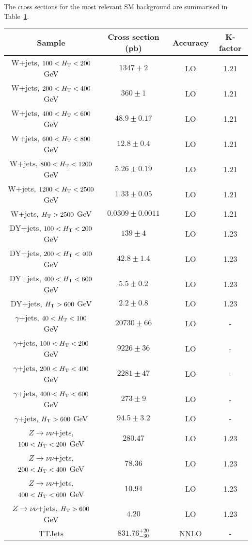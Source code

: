 The cross sections for the most relevant SM background are summarised in Table~\ref{tab:cross_sections_bkg}.

\begin{table}[!h]
  \scriptsize
  \centering
  \label{tab:cross_sections_bkg}
  \begin{tabular}
    {c|c|c|c}
    \hline\hline
    \textbf{Sample} & \textbf{Cross section (pb)} & \textbf{Accuracy} & \textbf{K-factor} \\
    \hline
    W+jets, $100 < \mbox{$H_\text{T}$} < 200$ GeV & $1347 \pm 2$ & LO & 1.21 \\
    W+jets, $200 < \mbox{$H_\text{T}$} < 400$ GeV & $360 \pm 1$ & LO & 1.21 \\
    W+jets, $400 < \mbox{$H_\text{T}$} < 600$ GeV & $48.9 \pm 0.17$ & LO & 1.21 \\
    W+jets, $600 < \mbox{$H_\text{T}$} < 800$ GeV & $12.8 \pm 0.4$ & LO & 1.21 \\
    W+jets, $800 < \mbox{$H_\text{T}$} < 1200$ GeV & $5.26 \pm 0.19$ & LO & 1.21 \\
    W+jets, $1200 < \mbox{$H_\text{T}$} < 2500$ GeV & $1.33 \pm 0.05$ & LO & 1.21 \\
    W+jets, $\mbox{$H_\text{T}$} > 2500$ GeV & $0.0309 \pm 0.0011$ & LO & 1.21 \\
    \hline
    DY+jets, $100 < \mbox{$H_\text{T}$} < 200$ GeV & $139 \pm 4$ & LO & 1.23 \\
    DY+jets, $200 < \mbox{$H_\text{T}$} < 400$ GeV & $42.8 \pm 1.4$ & LO & 1.23 \\
    DY+jets, $400 < \mbox{$H_\text{T}$} < 600$ GeV & $5.5 \pm 0.2$ & LO & 1.23 \\
    DY+jets, $\mbox{$H_\text{T}$} > 600$ GeV & $2.2 \pm 0.8$ & LO & 1.23 \\
    \hline
    $\gamma$+jets, $40 < \mbox{$H_\text{T}$} < 100$ GeV & $20730 \pm 66$ & LO & - \\
    $\gamma$+jets, $100 < \mbox{$H_\text{T}$} < 200$ GeV & $9226 \pm 36$ & LO & - \\
    $\gamma$+jets, $200 < \mbox{$H_\text{T}$} < 400$ GeV & $2281 \pm 47$ & LO & - \\
    $\gamma$+jets, $400 < \mbox{$H_\text{T}$} < 600$ GeV & $273 \pm 9$ & LO & - \\
    $\gamma$+jets, $\mbox{$H_\text{T}$} > 600$ GeV & $94.5 \pm 3.2$ & LO & - \\
    \hline
    $Z\rightarrow \nu\nu$+jets, $100 < \mbox{$H_\text{T}$} < 200$ GeV & $280.47$ & LO & 1.23 \\
    $Z\rightarrow \nu\nu$+jets, $200 < \mbox{$H_\text{T}$} < 400$ GeV & $78.36$ & LO & 1.23 \\
    $Z\rightarrow \nu\nu$+jets, $400 < \mbox{$H_\text{T}$} < 600$ GeV & $10.94$ & LO & 1.23 \\
    $Z\rightarrow \nu\nu$+jets, $\mbox{$H_\text{T}$} > 600$ GeV & $4.20$ & LO & 1.23 \\
    \hline
    TTJets & $831.76^{+20}_{-30}$ & NNLO & - \\
    \hline \hline
  \end{tabular}
\end{table}


